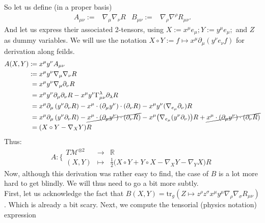 \documentclass[a4paper,11pt]{article}
\numberwithin{equation}{section}
\theoremstyle{definition}
\begin{document}
\noindent So let us define (in a proper basis)
\begin{align}
    A_{\mu\nu} :=& \nabla_\mu\nabla_\nu R&
    B_{\mu\nu} :=& \nabla_\rho\nabla^\rho R_{\mu\nu}.
\end{align}
And let us express their associated 2-tensors, using $X:=x^\mu e_\mu; Y:=y^\mu e_\mu;$ and $Z$ as dummy variables. We will use the notation $X\circ Y:= f \mapsto x^\mu \partial_\mu (y^\nu e_\nu f)$ for derivation along feilds.
\begin{align*}
    A(X,Y) :\!\!&= x^\mu y^\nu A_{\mu\nu}\\
    :\!\!&= x^\mu y^\nu \nabla_\mu \nabla_\nu R\\
    &= x^\mu y^\nu \nabla_\mu \partial_\nu R\\
    &= x^\mu y^\nu \partial_\mu \partial_\nu R - x^\mu y^\nu \Gamma_{\mu\nu}^\lambda \partial_\lambda R\\
    &= x^\mu \partial_\mu \left(y^\nu \partial_\nu R \right) - x^\mu \cdot(\partial_\mu y^\nu) \cdot (\partial_\nu R) - x^\mu y^\nu (\nabla_{e_\mu} \partial_\nu)R\\
    &= x^\mu \partial_\mu \left(y^\nu \partial_\nu R \right) - \cancel{x^\mu \cdot(\partial_\mu y^\nu) \cdot (\partial_\nu R)} - x^\mu \big(\nabla_{e_\mu} (y^\nu \partial_\nu)\big)R + \cancel{x^\mu \cdot (\partial_\mu y^\nu) \cdot (\partial_\nu R)}\\
    &= (X\circ Y - \nabla_X Y) R
\end{align*}
Thus:
\begin{equation}
    A : \Bigg\{\begin{matrix}
        T\mathcal{M}^{\otimes 2} & \to & \mathbb{R}\\
        (X,Y) & \mapsto & \frac{1}{2}\big(X\circ Y + Y\circ X - \nabla_X Y - \nabla_Y X\big) R
    \end{matrix}
\end{equation}
Now, although this derivation was rather easy to find, the case of $B$ is a lot more hard to get blindly. We will thus need to go a bit more subtly.
\\
First, let us acknowledge the fact that $B(X,Y)=\mathrm{tr}_g(Z\mapsto z^\rho z^\sigma x^\mu y^\mu \nabla_\rho \nabla_\sigma R_{\mu\nu})$. Which is already a bit scary. Next, we compute the tensorial (physics notation) expression
\end{document}
